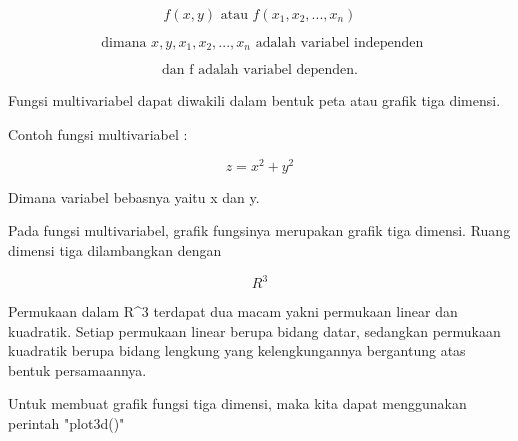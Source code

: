 \documentclass[a4paper,10pt]{article}
\begin{document}
\begin{eulernotebook}
\begin{eulercomment}
\begin{eulercomment}
\begin{eulercomment}
\begin{eulercomment}
\begin{eulercomment}
\begin{eulercomment}
\begin{eulercomment}
\begin{eulercomment}
\begin{eulercomment}
\begin{eulercomment}
\begin{eulercomment}
\begin{eulercomment}
\begin{eulercomment}
\begin{eulercomment}
\begin{eulercomment}
\begin{eulercomment}
\begin{eulercomment}
\begin{eulercomment}
\begin{eulercomment}
\begin{eulercomment}
\begin{eulercomment}
\begin{eulercomment}
\begin{eulercomment}
\begin{eulercomment}
\begin{eulercomment}
\begin{eulercomment}
\begin{eulercomment}
\end{eulercomment}
\begin{eulerformula}
\[
f(x,y) \text{ atau } f(x_1,x_2,...,x_n)
\]
\end{eulerformula}
\begin{eulerformula}
\[
\text{ dimana } x,y,x_1,x_2,...,x_n \text{ adalah variabel independen}
\]
\end{eulerformula}
\begin{eulerformula}
\[
\text{dan f adalah variabel dependen.}
\]
\end{eulerformula}
\begin{eulercomment}
Fungsi multivariabel dapat diwakili dalam bentuk peta atau grafik tiga
dimensi.

Contoh fungsi multivariabel :

\end{eulercomment}
\begin{eulerformula}
\[
z = x^2 + y^2
\]
\end{eulerformula}
\begin{eulercomment}
Dimana variabel bebasnya yaitu x dan y.

\begin{eulercomment}
\begin{eulercomment}
Pada fungsi multivariabel, grafik fungsinya merupakan grafik tiga
dimensi. Ruang dimensi tiga dilambangkan dengan\\
\end{eulercomment}
\begin{eulerformula}
\[
R^3
\]
\end{eulerformula}
\begin{eulercomment}
Permukaan dalam R\textasciicircum{}3 terdapat dua macam yakni permukaan linear dan
kuadratik. Setiap permukaan linear berupa bidang datar, sedangkan
permukaan kuadratik berupa bidang lengkung yang kelengkungannya
bergantung atas bentuk persamaannya.

Untuk membuat grafik fungsi tiga dimensi, maka kita dapat menggunakan
perintah "plot3d()"


\end{eulercomment}
\end{eulercomment}
\end{eulercomment}
\end{eulercomment}
\end{eulercomment}
\end{eulercomment}
\end{eulercomment}
\end{eulercomment}
\end{eulercomment}
\end{eulercomment}
\end{eulercomment}
\end{eulercomment}
\end{eulercomment}
\end{eulercomment}
\end{eulercomment}
\end{eulercomment}
\end{eulercomment}
\end{eulercomment}
\end{eulercomment}
\end{eulercomment}
\end{eulercomment}
\end{eulercomment}
\end{eulercomment}
\end{eulercomment}
\end{eulercomment}
\end{eulercomment}
\end{eulercomment}
\end{eulercomment}
\end{eulercomment}
\end{eulernotebook}
\end{document}
